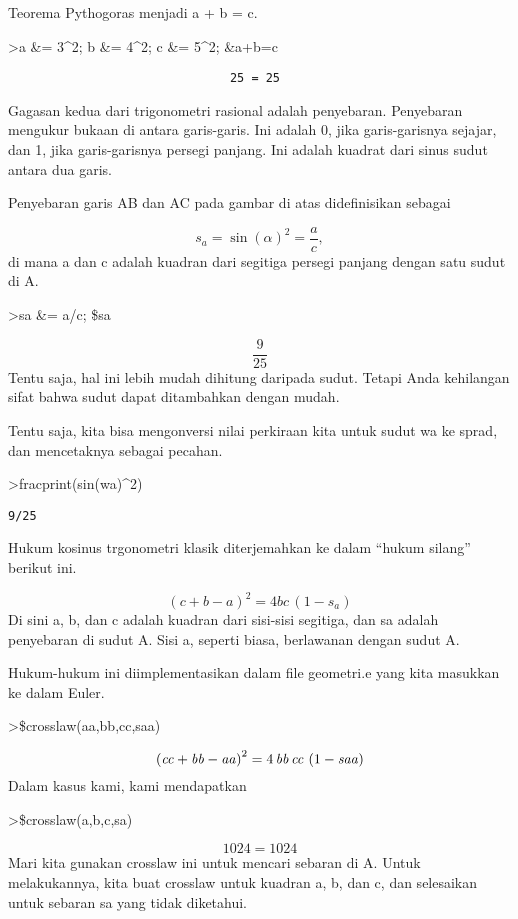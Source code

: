 \documentclass[
]{book}
\begin{document}
Teorema Pythogoras menjadi a + b = c.

\textgreater a \&= 3\^{}2; b \&= 4\^{}2; c \&= 5\^{}2; \&a+b=c

\begin{verbatim}
                               25 = 25
\end{verbatim}

Gagasan kedua dari trigonometri rasional adalah penyebaran. Penyebaran mengukur bukaan di antara garis-garis. Ini adalah 0, jika garis-garisnya sejajar, dan 1, jika garis-garisnya persegi panjang. Ini adalah kuadrat dari sinus sudut antara dua garis.

Penyebaran garis AB dan AC pada gambar di atas didefinisikan sebagai

\[s_a = \sin(\alpha)^2 = \frac{a}{c},\]di mana a dan c adalah kuadran dari segitiga persegi panjang dengan satu sudut di A.

\textgreater sa \&= a/c; \$sa

\[\frac{9}{25}\]Tentu saja, hal ini lebih mudah dihitung daripada sudut. Tetapi Anda kehilangan sifat bahwa sudut dapat ditambahkan dengan mudah.

Tentu saja, kita bisa mengonversi nilai perkiraan kita untuk sudut wa ke sprad, dan mencetaknya sebagai pecahan.

\textgreater fracprint(sin(wa)\^{}2)

\begin{verbatim}
9/25
\end{verbatim}

Hukum kosinus trgonometri klasik diterjemahkan ke dalam ``hukum silang'' berikut ini.

\[(c+b-a)^2 = 4 b c \, (1-s_a)\]Di sini a, b, dan c adalah kuadran dari sisi-sisi segitiga, dan sa adalah penyebaran di sudut A. Sisi a, seperti biasa, berlawanan dengan sudut A.

Hukum-hukum ini diimplementasikan dalam file geometri.e yang kita masukkan ke dalam Euler.

\textgreater\$crosslaw(aa,bb,cc,saa)

\[\left({\it cc}+{\it bb}-{\it aa}\right)^2=4\,{\it bb}\,{\it cc}\,
 \left(1-{\it saa}\right)\]Dalam kasus kami, kami mendapatkan

\textgreater\$crosslaw(a,b,c,sa)

\[1024=1024\]Mari kita gunakan crosslaw ini untuk mencari sebaran di A. Untuk melakukannya, kita buat crosslaw untuk kuadran a, b, dan c, dan selesaikan untuk sebaran sa yang tidak diketahui.
\end{document}
